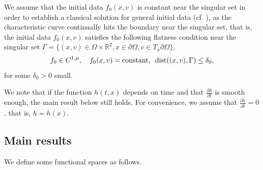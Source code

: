 \documentclass[11pt,reqno]{amsart}%
\theoremstyle{definition}
\theoremstyle{remark}
\begin{document}
We assume that the initial data $f_{0}(x,v)$ is constant near the singular set in order to establish a classical solution for general initial data (cf. \cite{HV}), as the characteristic curve continually   hits the boundary near the singular set, that is, 
the initial data $f_{0}(x,v)$  satisfies the following flatness condition near the singular set   
$\Gamma=\big\{(x,v)\in\Omega\times\mathbb{R}^{2}, x\in \partial\Omega,v\in T_{x}\partial\Omega\big\}$,     
\begin{align}
  f_{0}\in C^{1,\mu},\quad f_{0}(x,v)=\text{constant,\,\,  dist}((x,v), \Gamma)\leq \delta_{0},\label{v2.8}
\end{align}
for some $\delta_{0}>0$ small.
  
We note that if the function $h(t,x)$ depends on time and that $\frac{\partial h}{\partial t}$ is smooth enough, the    main result below still holds.
For convenience, we assume that $\frac{\partial h}{\partial t}=0$, that is,  $h=h(x)$.


\subsection{Main results}

We define some functional spaces as follows.  
\end{document}
